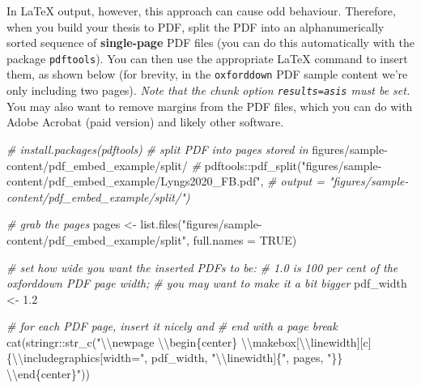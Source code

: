 \documentclass[a4paper, twoside]{templates/ociamthesis}
\newenvironment{Shaded}{\begin{snugshade}}{\end{snugshade}}
\newcommand{\AttributeTok}[1]{\textcolor[rgb]{0.77,0.63,0.00}{#1}}
\newcommand{\CommentTok}[1]{\textcolor[rgb]{0.56,0.35,0.01}{\textit{#1}}}
\newcommand{\ConstantTok}[1]{\textcolor[rgb]{0.00,0.00,0.00}{#1}}
\newcommand{\FloatTok}[1]{\textcolor[rgb]{0.00,0.00,0.81}{#1}}
\newcommand{\FunctionTok}[1]{\textcolor[rgb]{0.00,0.00,0.00}{#1}}
\newcommand{\NormalTok}[1]{#1}
\newcommand{\OtherTok}[1]{\textcolor[rgb]{0.56,0.35,0.01}{#1}}
\newcommand{\SpecialCharTok}[1]{\textcolor[rgb]{0.00,0.00,0.00}{#1}}
\newcommand{\StringTok}[1]{\textcolor[rgb]{0.31,0.60,0.02}{#1}}
\renewenvironment{Shaded}
{
  \vspace{10pt}%
  \begin{snugshade}%
}{%
  \end{snugshade}%
  \vspace{8pt}%
}
\begin{document}
In LaTeX output, however, this approach can cause odd behaviour.
Therefore, when you build your thesis to PDF, split the PDF into an alphanumerically sorted sequence of \textbf{single-page} PDF files (you can do this automatically with the package \texttt{pdftools}). You can then use the appropriate LaTeX command to insert them, as shown below (for brevity, in the \texttt{oxforddown} PDF sample content we're only including two pages).
\emph{Note that the chunk option \texttt{results=\textquotesingle{}asis\textquotesingle{}} must be set.}
You may also want to remove margins from the PDF files, which you can do with Adobe Acrobat (paid version) and likely other software.

\begin{Shaded}
\begin{Highlighting}[]
\CommentTok{\# install.packages(pdftools)}
\CommentTok{\# split PDF into pages stored in}
\NormalTok{    figures}\SpecialCharTok{/}\NormalTok{sample}\SpecialCharTok{{-}}\NormalTok{content}\SpecialCharTok{/}\NormalTok{pdf\_embed\_example}\SpecialCharTok{/}\NormalTok{split}\SpecialCharTok{/}
\CommentTok{\#}
\NormalTok{    pdftools}\SpecialCharTok{::}\FunctionTok{pdf\_split}\NormalTok{(}\StringTok{"figures/sample{-}content/pdf\_embed\_example/Lyngs2020\_FB.pdf"}\NormalTok{,}
\CommentTok{\# output = "figures/sample{-}content/pdf\_embed\_example/split/")}

\CommentTok{\# grab the pages}
\NormalTok{pages }\OtherTok{\textless{}{-}} \FunctionTok{list.files}\NormalTok{(}\StringTok{"figures/sample{-}content/pdf\_embed\_example/split"}\NormalTok{,}
    \AttributeTok{full.names =} \ConstantTok{TRUE}\NormalTok{)}

\CommentTok{\# set how wide you want the inserted PDFs to be:}
\CommentTok{\# 1.0 is 100 per cent of the oxforddown PDF page width;}
\CommentTok{\# you may want to make it a bit bigger}
\NormalTok{pdf\_width }\OtherTok{\textless{}{-}} \FloatTok{1.2}

\CommentTok{\# for each PDF page, insert it nicely and}
\CommentTok{\# end with a page break}
\FunctionTok{cat}\NormalTok{(stringr}\SpecialCharTok{::}\FunctionTok{str\_c}\NormalTok{(}\StringTok{"}\SpecialCharTok{\textbackslash{}\textbackslash{}}\StringTok{newpage }\SpecialCharTok{\textbackslash{}\textbackslash{}}\StringTok{begin\{center\}}
\StringTok{    }\SpecialCharTok{\textbackslash{}\textbackslash{}}\StringTok{makebox[}\SpecialCharTok{\textbackslash{}\textbackslash{}}\StringTok{linewidth][c]\{}\SpecialCharTok{\textbackslash{}\textbackslash{}}\StringTok{includegraphics[width="}\NormalTok{, pdf\_width,}
    \StringTok{"}\SpecialCharTok{\textbackslash{}\textbackslash{}}\StringTok{linewidth]\{"}\NormalTok{, pages, }\StringTok{"\}\} }\SpecialCharTok{\textbackslash{}\textbackslash{}}\StringTok{end\{center\}"}\NormalTok{))}
\end{Highlighting}
\end{Shaded}
\end{document}
